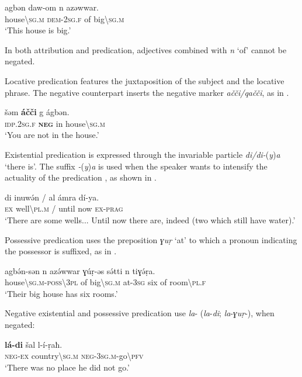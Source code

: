 \documentclass[output=paper,colorlinks,citecolor=brown]{langscibook}
\begin{document}
\ea\label{ex:siw:23}
    \gll agbən daw-om n azəwwar. \\
         house{\textbackslash}\textsc{sg.m} \textsc{dem-2sg.f} of big{\textbackslash}\textsc{sg.m} \\
    \glt ‘This house is big.’
\z

In both attribution and predication, adjectives combined with \textit{n} ‘of’ cannot be negated. 

Locative predication features the juxtaposition of the subject and the locative phrase. The negative counterpart inserts the negative marker \textit{ačči/qačči}, as in . 

\ea\label{ex:siw:24}
    \gll šəm \textbf{áčči} g ágbən. \\
         \textsc{idp.2sg.f} \textbf{\textsc{neg}} in house{\textbackslash}\textsc{sg.m} \\
    \glt ‘You are not in the house.’
\z

Existential predication is expressed through the invariable particle \textit{di/di-}(\textit{y})\textit{a} ‘there is’. The suffix \textit{{}-}(\textit{y})\textit{a }is used when the speaker wants to intensify the actuality of the predication \citep[173]{Schiattarella2019}, as shown in .


\ea\label{ex:siw:25}
    \gll di inuwə́n / al ámra dí-ya. \\
         \textsc{ex} well{\textbackslash}\textsc{pl.m} / until now \textsc{ex-prag}\\
    \glt ‘There are some wells... Until now there are, indeed (two which still have water).’
\z

Possessive predication uses the preposition \textit{ɣuṛ} ‘at’ to which a pronoun indicating the possessor is suffixed, as in .


\ea\label{ex:siw:26}
    \gll agbə́n-sən n azə́wwar ɣúṛ-əs sə́tti n tiɣə́ṛ{\fdot}a.\\
         house{\textbackslash}\textsc{sg.m-poss{\textbackslash}3pl} of big{\textbackslash}\textsc{sg.m} at-\textsc{3sg} six of room{\textbackslash}\textsc{pl.f} \\
    \glt ‘Their big house has six rooms.’
\z

Negative existential  and possessive predication  use \textit{la}{}- (\textit{la}{}-\textit{di}; \textit{la}{}-\textit{ɣuṛ}{}-), when negated:


\ea\label{ex:siw:27}
    \gll \textbf{lá-di} šal l-í-ṛaħ. \\
         \textsc{neg-ex} country{\textbackslash}\textsc{sg.m} \textsc{neg-3sg.m-}go{\textbackslash}\textsc{pfv} \\
    \glt ‘There was no place he did not go.’
\z
\end{document}
